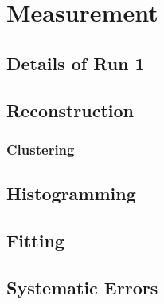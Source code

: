 
\chapter{\texorpdfstring{\wa}{wa} Measurement}
\label{chapter:SpinPrecessionMeasurement}
\thispagestyle{myheadings}

\section{Details of Run 1}
\label{sec:Data}

\section{Reconstruction}
\label{sec:ReconWest}

\cite{AFThesis}

\subsection{Clustering}
\label{sec:Clustering}

\section{Histogramming}
\label{sec:Histogramming}

\section{Fitting}
\label{sec:Fitting}

\section{Systematic Errors}
\label{sec:Systematic Errors}



\cleardoublepage

